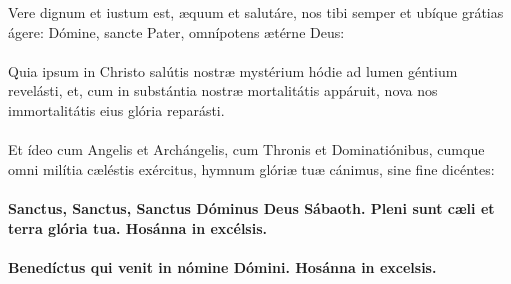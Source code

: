 \documentclass[12pt, a4paper]{article}
\begin{document}
	\\
	\\
	\\
	\\
	\\
	Vere dignum et iustum est, æquum
	et salutáre, nos tibi semper et
	ubíque grátias ágere: Dómine,
	sancte Pater, omnípotens ætérne
	Deus:
	\\\\
	Quia ipsum in Christo salútis
	nostræ mystérium hódie ad lumen
	géntium revelásti, et, cum in
	substántia nostræ mortalitátis
	appáruit, nova nos immortalitátis
	eius glória reparásti.
	\\\\
	Et ídeo cum Angelis et
	Archángelis, cum Thronis et
	Dominatiónibus, cumque omni
	milítia cæléstis exércitus, hymnum
	glóriæ tuæ cánimus, sine fine
	dicéntes:
	\\\\
	\textbf{Sanctus, Sanctus, Sanctus Dóminus
		Deus Sábaoth. Pleni sunt cæli et
		terra glória tua. Hosánna in
		excélsis.}
	\\\\
	\textbf{Benedíctus qui venit in nómine
		Dómini. Hosánna in excelsis.}
	
	\newpage
	
\end{document}
